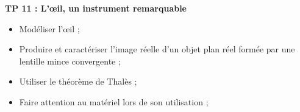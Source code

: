 
\renewcommand{\thesection}{\textcolor{red}{Partie \Roman{section} -}}
\renewcommand{\thesubsection}{\textcolor{red}{\Roman{section}.\arabic{subsection}}}
\renewcommand{\thesubsubsection}{\textcolor{red}{\Roman{section}.\arabic{subsection}.\alph{subsubsection}}}

\setcounter{section}{0}
\setcounter{document}{0}
\sndEnTeteTPOnze

\begin{center}
\begin{mdframed}[style=titr, leftmargin=60pt, rightmargin=60pt, innertopmargin=7pt, innerbottommargin=7pt, innerrightmargin=8pt, innerleftmargin=8pt]

\begin{center}
\large{\textbf{TP 11 : L'\oe il, un instrument remarquable
}}
\end{center}
\end{mdframed}
\end{center}


\begin{tcolorbox}[colback=blue!5!white,colframe=blue!75!black,title=Objectifs de la séance :]
\begin{itemize}
    \item Modéliser l'\oe il ;
    \item Produire et caractériser l'image réelle d'un objet plan réel formée par une lentille mince convergente ;
    \item Utiliser le théorème de Thalès ;
\end{itemize}
\end{tcolorbox}

\begin{tcolorbox}[colback=red!5!white,colframe=red!75!black,title= Consignes :]
\begin{itemize}
    \item Faire attention au matériel lors de son utilisation ;
\end{itemize}
\end{tcolorbox}


